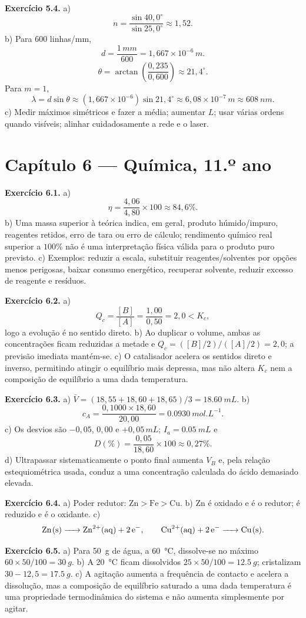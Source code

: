 \documentclass[11pt,a4paper,openany]{book}
\begin{document}
\medskip
\textbf{Exercício 5.4.} a)
\[
n=\frac{\sin40,0^\circ}{\sin25,0^\circ}\approx1,52.
\]
b) Para 600 linhas/mm,
\[
d=\frac{1\,\si{mm}}{600}=1,667\times10^{-6}\,\si{m}.
\]
\[
\theta=\arctan\left(\frac{0,235}{0,600}\right)\approx21,4^\circ.
\]
Para $m=1$,
\[
\lambda=d\sin\theta\approx(1,667\times10^{-6})\sin21,4^\circ
\approx6,08\times10^{-7}\,\si{m}\approx\SI{608}{nm}.
\]
c) Medir máximos simétricos e fazer a média; aumentar $L$; usar várias ordens quando visíveis; alinhar cuidadosamente a rede e o laser.

\section*{Capítulo 6 — Química, 11.º ano}

\textbf{Exercício 6.1.} a)
\[
\eta=\frac{4,06}{4,80}\times100\approx84,6\%.
\]
b) Uma massa superior à teórica indica, em geral, produto húmido/impuro, reagentes retidos, erro de tara ou erro de cálculo; rendimento químico real superior a $100\%$ não é uma interpretação física válida para o produto puro previsto. c) Exemplos: reduzir a escala, substituir reagentes/solventes por opções menos perigosas, baixar consumo energético, recuperar solvente, reduzir excesso de reagente e resíduos.

\medskip
\textbf{Exercício 6.2.} a)
\[
Q_c=\frac{[B]}{[A]}=\frac{1,00}{0,50}=2,0<K_c,
\]
logo a evolução é no sentido direto. b) Ao duplicar o volume, ambas as concentrações ficam reduzidas a metade e $Q_c=([B]/2)/([A]/2)=2,0$; a previsão imediata mantém-se. c) O catalisador acelera os sentidos direto e inverso, permitindo atingir o equilíbrio mais depressa, mas não altera $K_c$ nem a composição de equilíbrio a uma dada temperatura.

\medskip
\textbf{Exercício 6.3.} a) $\bar V=(18,55+18,60+18,65)/3=\SI{18.60}{mL}$. b)
\[
c_A=\frac{0,1000\times18,60}{20,00}=\SI{0.0930}{mol.L^{-1}}.
\]
c) Os desvios são $-0,05$, $0,00$ e $+0,05\,\si{mL}$; $I_a=\SI{0.05}{mL}$ e
\[
D(\%)=\frac{0,05}{18,60}\times100\approx0,27\%.
\]
d) Ultrapassar sistematicamente o ponto final aumenta $V_B$ e, pela relação estequiométrica usada, conduz a uma concentração calculada do ácido demasiado elevada.

\medskip
\textbf{Exercício 6.4.} a) Poder redutor: $\boxed{\mathrm{Zn>Fe>Cu}}$. b) Zn é oxidado e é o redutor;  é reduzido e é o oxidante. c)
\[
\ce{Zn(s) -> Zn^{2+}(aq) + 2e-},
\qquad
\ce{Cu^{2+}(aq) + 2e- -> Cu(s)}.
\]

\medskip
\textbf{Exercício 6.5.} a) Para \SI{50}{g} de água, a \SI{60}{\celsius}, dissolve-se no máximo $60\times50/100=\SI{30}{g}$. b) A \SI{20}{\celsius} ficam dissolvidos $25\times50/100=\SI{12.5}{g}$; cristalizam $30-12,5=\SI{17.5}{g}$. c) A agitação aumenta a frequência de contacto e acelera a dissolução, mas a composição de equilíbrio saturado a uma dada temperatura é uma propriedade termodinâmica do sistema e não aumenta simplesmente por agitar.
\end{document}
